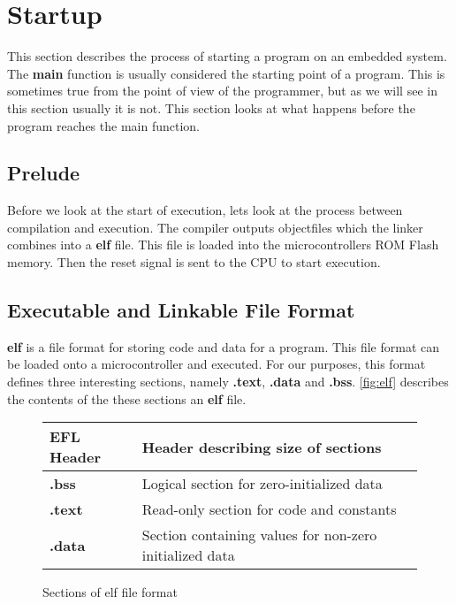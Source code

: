 \section{Startup}
\label{sec:back:startup}

This section describes the process of starting a program on an embedded system.
The \textbf{main} function is usually considered the starting point of a program.
This is sometimes true from the point of view of the programmer, but as we will see in this section usually it is not.
This section looks at what happens before the program reaches the main function.

\subsection{Prelude}

Before we look at the start of execution, lets look at the process between compilation and execution.
The compiler outputs objectfiles which the linker combines into a \textbf{elf} file.
This file is loaded into the microcontrollers ROM Flash memory.
Then the reset signal is sent to the CPU to start execution.

\subsection{Executable and Linkable File Format}
\textbf{elf} is a file format for storing code and data for a program.
This file format can be loaded onto a microcontroller and executed.
For our purposes, this format defines three interesting sections, namely \textbf{.text}, \textbf{.data} and \textbf{.bss}.
\autoref{fig:elf} describes the contents of the these sections an \textbf{elf} file.

\begin{figure}[H]
  \centering
  \begin{tabular}{|l|l|}
    \hline
    EFL Header & Header describing size of sections \\
    \hline
    \textbf{.bss} & Logical section for zero-initialized data \\
    \hline
    \textbf{.text} & Read-only section for code and constants \\
    \hline
    \textbf{.data} & Section containing values for non-zero initialized data \\
    \hline
  \end{tabular}
  \caption{Sections of elf file format}
  \label{fig:elf}
\end{figure}


